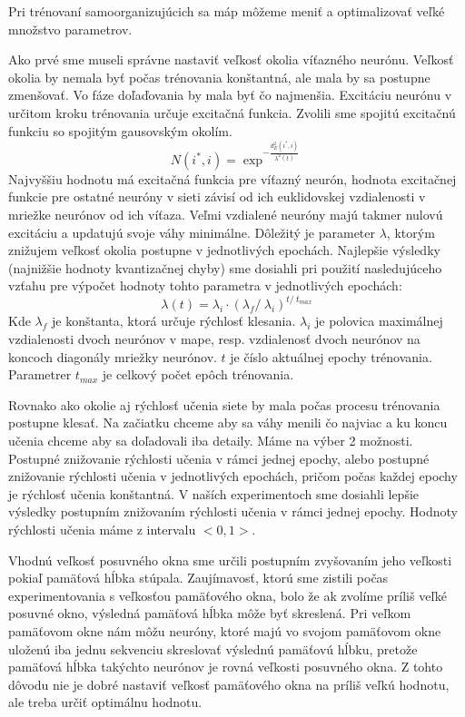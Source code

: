 Pri trénovaní samoorganizujúcich sa máp môžeme meniť a optimalizovať veľké množstvo parametrov. 

Ako prvé sme museli správne nastaviť veľkosť okolia víťazného neurónu.
Veľkosť okolia by nemala byť počas trénovania konštantná, ale mala by sa postupne zmenšovať.
Vo fáze doľaďovania by mala byť čo najmenšia.
Excitáciu neurónu v určitom kroku trénovania určuje excitačná funkcia. Zvolili sme spojitú
excitačnú funkciu so spojitým gausovským okolím. 
\begin{equation}
    N(i^{*}, i) = \exp^{- \frac{d^{2}_{E}(i^{*}, i)}{\lambda^{2}(t)}}
\end{equation}
Najvyššiu hodnotu má excitačná funkcia pre víťazný neurón, hodnota excitačnej funkcie pre ostatné 
neuróny v sieti závisí od ich euklidovskej vzdialenosti v mriežke neurónov od ich víťaza. Veľmi vzdialené neuróny 
majú takmer nulovú excitáciu a updatujú svoje váhy minimálne.
Dôležitý je parameter $\lambda$, ktorým znižujem veľkosť okolia postupne v jednotlivých epochách.
Najlepšie výsledky (najnižšie hodnoty kvantizačnej chyby) sme dosiahli pri použití nasledujúceho vzťahu pre výpočet hodnoty tohto parametra
v jednotlivých epochách:
\begin{equation}
    \lambda{(t)} = \lambda_{i} \cdot (\lambda_{f} /\ \lambda_{i})^{t /\ t_{max}}
\end{equation}
Kde $\lambda_{f}$ je konštanta, ktorá určuje rýchlosť klesania. 
$\lambda_{i}$ je polovica maximálnej vzdialenosti dvoch neurónov v mape, resp. 
vzdialenosť dvoch neurónov na koncoch diagonály mriežky neurónov.
$t$ je číslo aktuálnej epochy trénovania. Parametrer $t_{max}$ je celkový počet 
epôch trénovania.

Rovnako ako okolie aj rýchlosť učenia siete by mala počas
procesu trénovania postupne klesať. Na začiatku chceme aby sa váhy menili čo najviac
a ku koncu učenia chceme aby sa doľadovali iba detaily.
Máme na výber 2 možnosti. Postupné znižovanie rýchlosti učenia v rámci jednej epochy, alebo 
postupné znižovanie rýchlosti učenia v jednotlivých epochách, pričom počas každej epochy
je rýchlosť učenia konštantná. 
V naších experimentoch sme dosiahli lepšie výsledky postupním 
znižovaním rýchlosti učenia v rámci jednej epochy. 
Hodnoty rýchlosti učenia máme z intervalu $<0, 1>$.

Vhodnú veľkosť posuvného okna sme určili postupním zvyšovaním jeho veľkosti pokiaľ pamäťová hĺbka stúpala. 
Zaujímavosť, ktorú sme zistili počas experimentovania s veľkosťou pamäťového okna, bolo že 
ak zvolíme príliš veľké posuvné okno, výsledná pamäťová hĺbka môže byť skreslená.
Pri veľkom pamäťovom okne nám môžu neuróny, ktoré majú vo svojom pamäťovom okne uloženú iba 
jednu sekvenciu skreslovať výslednú pamäťovú hĺbku, pretože pamäťová hĺbka takýchto
neurónov je rovná veľkosti posuvného okna. Z tohto dôvodu nie je dobré nastaviť veľkosť pamäťového okna na 
príliš veľkú hodnotu, ale treba určiť optimálnu hodnotu.

